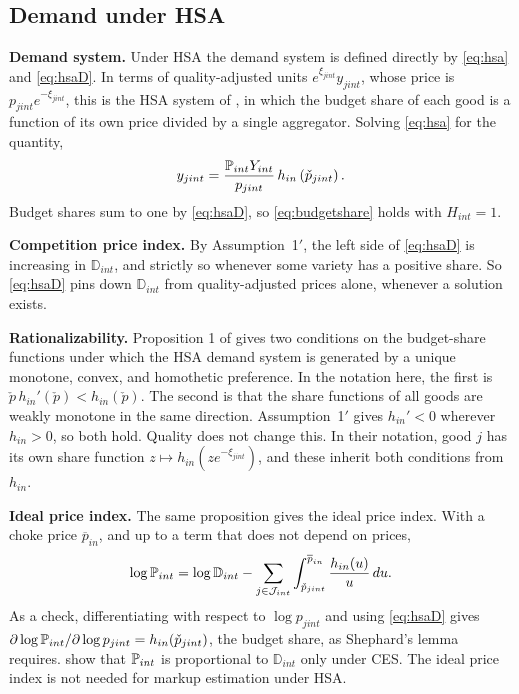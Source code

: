 \subsection{Demand under HSA}\label{sec:app-hsa}

\textbf{Demand system.}
Under HSA the demand system is defined directly by \eqref{eq:hsa} and \eqref{eq:hsaD}.
In terms of quality-adjusted units $e^{\xi_{jint}} y_{jint}$, whose price is $p_{jint} e^{-\xi_{jint}}$, this is the HSA system of \textcite{Matsuyama&Ushev17}, in which the budget share of each good is a function of its own price divided by a single aggregator.
Solving \eqref{eq:hsa} for the quantity,
\begin{equation*}
	y_{jint} = \frac{\P_{int} Y_{int}}{p_{jint}} \, h_{in}\left(\check{p}_{jint}\right).
\end{equation*}
Budget shares sum to one by \eqref{eq:hsaD}, so \eqref{eq:budgetshare} holds with $H_{int} = 1$.

\textbf{Competition price index.}
By Assumption~1$'$, the left side of \eqref{eq:hsaD} is increasing in $\mathbb{D}_{int}$, and strictly so whenever some variety has a positive share.
So \eqref{eq:hsaD} pins down $\mathbb{D}_{int}$ from quality-adjusted prices alone, whenever a solution exists.

\textbf{Rationalizability.}
Proposition 1 of \textcite{Matsuyama&Ushev17} gives two conditions on the budget-share functions under which the HSA demand system is generated by a unique monotone, convex, and homothetic preference.
In the notation here, the first is $\check{p}\, h_{in}'(\check{p}) < h_{in}(\check{p})$.
The second is that the share functions of all goods are weakly monotone in the same direction.
Assumption~1$'$ gives $h_{in}' < 0$ wherever $h_{in} > 0$, so both hold.
Quality does not change this.
In their notation, good $j$ has its own share function $z \mapsto h_{in}(z e^{-\xi_{jint}})$, and these inherit both conditions from $h_{in}$.

\textbf{Ideal price index.}
The same proposition gives the ideal price index.
With a choke price $\overline{p}_{in}$, and up to a term that does not depend on prices,
\begin{equation*}
	\log \P_{int} = \log \mathbb{D}_{int} - \sum_{j \in \cJ_{int}} \int_{\check{p}_{jint}}^{\overline{p}_{in}} \frac{h_{in}(u)}{u} \, du .
\end{equation*}
As a check, differentiating with respect to $\log p_{jint}$ and using \eqref{eq:hsaD} gives $\partial \log \P_{int}/\partial \log p_{jint} = h_{in}(\check{p}_{jint})$, the budget share, as Shephard's lemma requires.
\textcite{Matsuyama&Ushev17} show that $\P_{int}$ is proportional to $\mathbb{D}_{int}$ only under CES.
The ideal price index is not needed for markup estimation under HSA.

